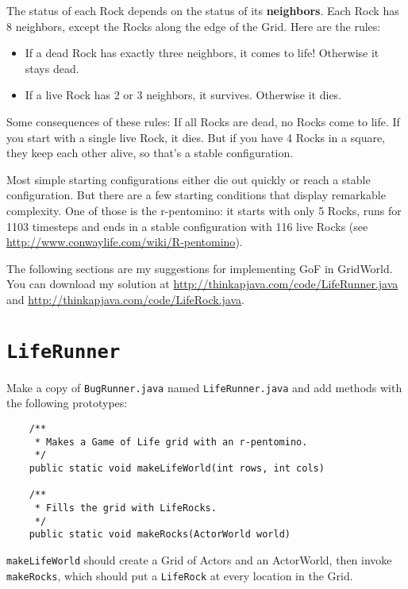 \documentclass[12pt]{book}
\theoremstyle{definition}
\begin{document}
The status of each Rock depends on the status of its
{\bf neighbors}.  Each Rock has 8 neighbors, except the Rocks along
the edge of the Grid.  Here are the rules:

\begin{itemize}

\item If a dead Rock has exactly three neighbors, it comes to life!
Otherwise it stays dead.

\item If a live Rock has 2 or 3 neighbors, it survives.  Otherwise it dies.

\end{itemize}

Some consequences of these rules:
If all Rocks are dead, no Rocks come to life.  If you start with a
single live Rock, it dies.  But if you have 4 Rocks in a square, they
keep each other alive, so that's a stable configuration.

Most simple starting configurations either die out quickly or reach a
stable configuration.  But there are a few starting conditions that
display remarkable complexity.  One of those is the r-pentomino: it
starts with only 5 Rocks, runs for 1103 timesteps and ends in a stable
configuration with 116 live Rocks (see
\url{http://www.conwaylife.com/wiki/R-pentomino}).

The following sections are my suggestions for implementing GoF
in GridWorld.  You can download my solution at
\url{http://thinkapjava.com/code/LifeRunner.java} and
\url{http://thinkapjava.com/code/LifeRock.java}.


\section{{\tt LifeRunner}}

Make a copy of {\tt BugRunner.java} named {\tt LifeRunner.java}
and add methods with the following prototypes:

\begin{lstlisting}
    /**
     * Makes a Game of Life grid with an r-pentomino.
     */
    public static void makeLifeWorld(int rows, int cols)

    /**
     * Fills the grid with LifeRocks.
     */
    public static void makeRocks(ActorWorld world)
\end{lstlisting}

{\tt makeLifeWorld} should create a Grid of Actors and an ActorWorld,
then invoke {\tt makeRocks}, which should put a {\tt LifeRock} at
every location in the Grid.
\end{document}
